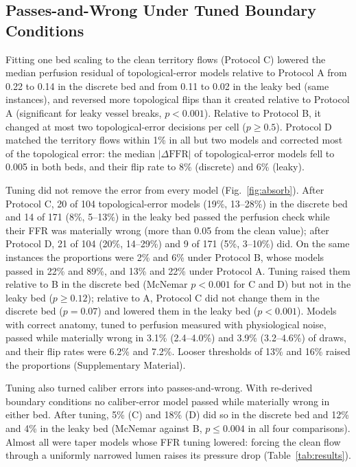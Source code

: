 \documentclass[journal,twoside,web]{ieeecolor}
\begin{document}
\subsection{Passes-and-Wrong Under Tuned Boundary Conditions}
Fitting one bed scaling to the clean territory flows (Protocol C) lowered the median perfusion residual of
topological-error models relative to Protocol A from 0.22 to 0.14 in the discrete bed and from 0.11 to 0.02 in the
leaky bed (same instances), and reversed
more topological flips than it created relative to Protocol A (significant for leaky vessel breaks, $p < 0.001$).
Relative to Protocol B, it changed at most two topological-error decisions per cell ($p \geq 0.5$).
Protocol D matched the territory flows within 1\% in all but two models and corrected most of the topological error:
the median $|\Delta\mathrm{FFR}|$ of topological-error models fell to 0.005 in both beds, and their flip rate to 8\%
(discrete) and 6\% (leaky).

Tuning did not remove the error from every model (Fig.~\ref{fig:absorb}). After Protocol C, 20 of 104 topological-error
models (19\%, 13--28\%) in the discrete bed and 14 of 171 (8\%, 5--13\%) in the leaky bed passed the perfusion check
while their FFR was materially wrong (more than 0.05 from the clean value); after Protocol D, 21 of 104 (20\%,
14--29\%) and 9 of 171 (5\%, 3--10\%) did. On the same instances the proportions were 2\% and 6\% under Protocol B, whose models passed in 22\% and 89\%, and
13\% and 22\% under Protocol A. Tuning raised them relative to B in the discrete bed (McNemar $p < 0.001$ for C and D)
but not in the leaky bed ($p \geq 0.12$); relative to A, Protocol C did not change them in the discrete bed
($p = 0.07$) and lowered them in the leaky bed ($p < 0.001$). Models with
correct anatomy, tuned to perfusion measured with physiological noise, passed while materially wrong in 3.1\% (2.4--4.0\%) and 3.9\% (3.2--4.6\%) of draws, and their flip rates were 6.2\% and 7.2\%.
Looser thresholds of 13\% and 16\% raised the proportions (Supplementary Material).

Tuning also turned caliber errors into passes-and-wrong. With re-derived boundary conditions no caliber-error model
passed while materially wrong in either bed. After tuning, 5\% (C) and 18\% (D) did so in the discrete bed and 12\%
and 4\% in the leaky bed (McNemar against B, $p \leq 0.004$ in all four comparisons). Almost all were taper models
whose FFR tuning lowered: forcing the clean flow through a uniformly narrowed lumen raises its pressure drop
(Table~\ref{tab:results}).
\end{document}
